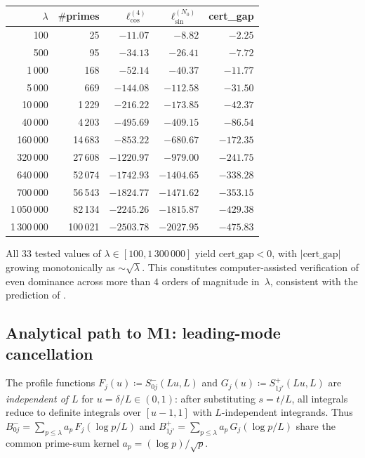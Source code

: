 \documentclass[12pt,a4paper]{article}
\theoremstyle{definition}
\theoremstyle{remark}
\begin{document}
\begin{center}
\small
\renewcommand{\arraystretch}{1.15}
\begin{tabular}{r|r|r|r|r}
$\lambda$ & $\#$primes & $\ell_{\cos}^{(4)}$ & $\ell_{\sin}^{(N_0)}$ & cert\_gap \\\hline
100   & 25     & $-11.07$ & $-8.82$   & $-2.25$ \\
500   & 95     & $-34.13$ & $-26.41$  & $-7.72$ \\
1\,000 & 168   & $-52.14$ & $-40.37$  & $-11.77$ \\
5\,000 & 669   & $-144.08$ & $-112.58$ & $-31.50$ \\
10\,000 & 1\,229 & $-216.22$ & $-173.85$ & $-42.37$ \\
40\,000 & 4\,203 & $-495.69$ & $-409.15$ & $-86.54$ \\
160\,000 & 14\,683 & $-853.22$ & $-680.67$ & $-172.35$ \\
320\,000 & 27\,608 & $-1220.97$ & $-979.00$ & $-241.75$ \\
640\,000 & 52\,074 & $-1742.93$ & $-1404.65$ & $-338.28$ \\
700\,000 & 56\,543 & $-1824.77$ & $-1471.62$ & $-353.15$ \\
1\,050\,000 & 82\,134 & $-2245.26$ & $-1815.87$ & $-429.38$ \\
1\,300\,000 & 100\,021 & $-2503.78$ & $-2027.95$ & $-475.83$
\end{tabular}
\end{center}

\noindent All $33$ tested values of $\lambda \in [100, 1\,300\,000]$ yield $\mathrm{cert\_gap} < 0$, with $|\mathrm{cert\_gap}|$ growing monotonically as $\sim\!\sqrt{\lambda}$. This constitutes computer-assisted verification of even dominance across more than $4$ orders of magnitude in~$\lambda$, consistent with the prediction of .

\subsection{Analytical path to M1: leading-mode cancellation}
\label{sec:leading-mode}

The profile functions $F_j(u) \coloneqq S^-_{0j}(Lu, L)$ and $G_j(u) \coloneqq S^+_{1j'}(Lu, L)$ are \emph{independent of $L$} for $u = \delta/L \in (0,1)$: after substituting $s = t/L$, all integrals reduce to definite integrals over $[u-1, 1]$ with $L$-independent integrands. Thus $B_{0j}^- = \sum_{p \leq \lambda} a_p\, F_j(\log p/L)$ and $B_{1j'}^+ = \sum_{p \leq \lambda} a_p\, G_j(\log p/L)$ share the common prime-sum kernel $a_p = (\log p)/\sqrt{p}$.
\end{document}
